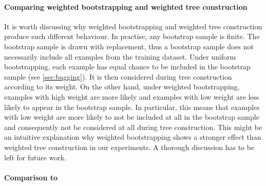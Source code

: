 \documentclass[../main.tex]{subfiles}
\begin{document}



\paragraph{Comparing weighted bootstrapping and weighted tree construction} It is worth discussing why weighted bootstrapping and weighted tree construction produce such different behaviour. 
%
%
In practise, any bootstrap sample is finite. The bootstrap sample is drawn with replacement, thus a bootstrap sample does not necessarily include all examples from the training dataset. 
%
Under uniform bootstrapping, each example has equal chance to be included in the bootstrap sample (see \ref{sec:bagging}). It is then considered during tree construction according to its weight. On the other hand, under weighted bootstrapping, examples with high weight are more likely and examples with low weight are less likely to appear in the bootstrap sample. In particular, this means that examples with low weight are more likely to not be included at all in the bootstrap sample and consequently not be considered at all during tree construction. 
%
This might be an intuitive explanation why weighted bootstrapping shows a stronger effect than weighted tree construction in our experiments.  A thorough discussion has to be left for future work. 



\paragraph{Comparison to \cite{bernard-drf}} 
\end{document}

